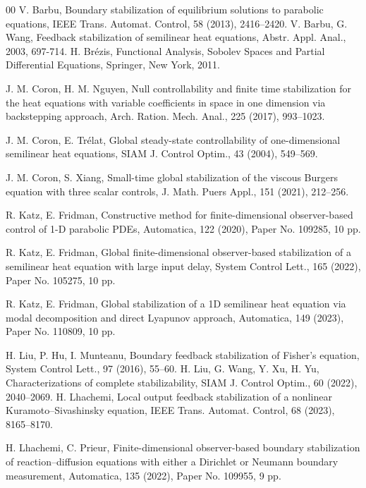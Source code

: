 \documentclass[review]{elsarticle}
\numberwithin{equation}{section}
\begin{document}
\begin{thebibliography}{00}
V. Barbu, Boundary stabilization of equilibrium solutions to parabolic equations, IEEE Trans. Automat. Control, 58 (2013), 2416–2420.
V. Barbu, G. Wang, Feedback stabilization of semilinear heat equations, Abstr. Appl. Anal., 2003, 697-714.
H. Brézis, Functional Analysis, Sobolev Spaces and Partial Differential Equations, Springer, New York, 2011.

J. M. Coron, H. M. Nguyen, Null controllability and finite time stabilization for the heat equations with variable coefficients in space in one dimension via backstepping approach, Arch. Ration. Mech. Anal., 225 (2017), 993–1023.

J. M. Coron, E. Trélat, Global steady-state controllability of one-dimensional semilinear heat equations, SIAM J. Control Optim., 43 (2004), 549–569.

J. M. Coron, S. Xiang, Small-time global stabilization of the viscous Burgers equation with three scalar controls, J. Math. Puers Appl., 151 (2021), 212–256.

R. Katz, E. Fridman, Constructive method for finite-dimensional observer-based control of 1-D parabolic PDEs, Automatica, 122 (2020), Paper No. 109285, 10 pp.

R. Katz, E. Fridman, Global finite-dimensional observer-based stabilization of a semilinear heat equation with large input delay, System Control Lett., 165 (2022), Paper No. 105275, 10 pp.

R. Katz, E. Fridman, Global stabilization of a 1D semilinear heat equation via modal decomposition and direct Lyapunov approach, Automatica, 149 (2023), Paper No. 110809, 10 pp.

H. Liu, P. Hu, I. Munteanu, Boundary feedback stabilization of Fisher’s equation, System Control Lett., 97 (2016), 55–60.
H. Liu, G. Wang, Y. Xu, H. Yu, Characterizations of complete stabilizability, SIAM J. Control Optim., 60 (2022), 2040–2069.
H. Lhachemi, Local output feedback stabilization of a nonlinear Kuramoto–Sivashinsky equation, IEEE Trans. Automat. Control, 68 (2023), 8165–8170.

H. Lhachemi, C. Prieur, Finite-dimensional observer-based boundary stabilization of reaction–diffusion equations with either a Dirichlet or Neumann boundary measurement, Automatica, 135 (2022), Paper No. 109955, 9 pp.


\end{thebibliography}
\end{document}
